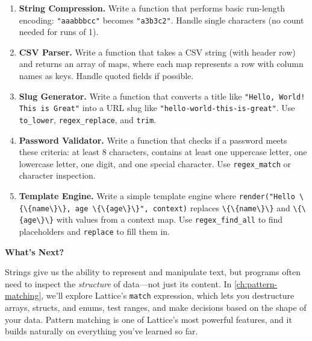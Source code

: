 \begin{enumerate}
  \item \textbf{String Compression.} Write a function that performs basic run-length encoding: \lstinline|"aaabbbcc"| becomes \lstinline|"a3b3c2"|. Handle single characters (no count needed for runs of 1).

  \item \textbf{CSV Parser.} Write a function that takes a CSV string (with header row) and returns an array of maps, where each map represents a row with column names as keys. Handle quoted fields if possible.

  \item \textbf{Slug Generator.} Write a function that converts a title like \lstinline|"Hello, World! This is Great"| into a URL slug like \lstinline|"hello-world-this-is-great"|. Use \lstinline|to_lower|, \lstinline|regex_replace|, and \lstinline|trim|.

  \item \textbf{Password Validator.} Write a function that checks if a password meets these criteria: at least 8 characters, contains at least one uppercase letter, one lowercase letter, one digit, and one special character. Use \lstinline|regex_match| or character inspection.

  \item \textbf{Template Engine.} Write a simple template engine where \lstinline|render("Hello \{\{name\}\}, age \{\{age\}\}", context)| replaces \lstinline|\{\{name\}\}| and \lstinline|\{\{age\}\}| with values from a context map. Use \lstinline|regex_find_all| to find placeholders and \lstinline|replace| to fill them in.
\end{enumerate}

\vspace{1em}
\noindent\textbf{What's Next?}

Strings give us the ability to represent and manipulate text, but programs often need to inspect the \emph{structure} of data---not just its content. In \cref{ch:pattern-matching}, we'll explore Lattice's \lstinline|match| expression, which lets you destructure arrays, structs, and enums, test ranges, and make decisions based on the shape of your data. Pattern matching is one of Lattice's most powerful features, and it builds naturally on everything you've learned so far.
